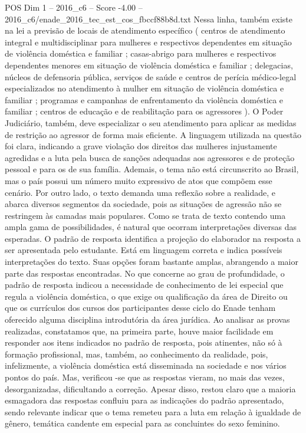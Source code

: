 \begin{textsample}{POS Dim 1 – 2016\_c6 – Score -4.00 – 2016\_c6/enade\_2016\_tec\_est\_cos\_fbccf88b8d.txt}
Nessa linha, também existe na lei a previsão de locais de atendimento específico ( centros de atendimento integral e multidisciplinar para mulheres e respectivos dependentes em situação de violência doméstica e familiar ; casas-abrigo para mulheres e respectivos dependentes menores em situação de violência doméstica e familiar ; delegacias, núcleos de defensoria pública, serviços de saúde e centros de perícia médico-legal especializados no atendimento à mulher em situação de violência doméstica e familiar ; programas e campanhas de enfrentamento da violência doméstica e familiar ; centros de educação e de reabilitação para os agressores ).
O Poder Judiciário, também, deve especializar o seu atendimento para aplicar as medidas de restrição ao agressor de forma mais eficiente.
A linguagem utilizada na questão foi clara, indicando a grave violação dos direitos das mulheres injustamente agredidas e a luta pela busca de sanções adequadas aos agressores e de proteção pessoal e para os de sua família.
Ademais, o tema não está circunscrito ao Brasil, mas o país possui um número muito expressivo de atos que compõem esse cenário.
Por outro lado, o texto demanda uma reflexão sobre a realidade, e abarca diversos segmentos da sociedade, pois as situações de agressão não se restringem às camadas mais populares.
Como se trata de texto contendo uma ampla gama de possibilidades, é natural que ocorram interpretações diversas das esperadas.
O padrão de resposta identifica a projeção do elaborador na resposta a ser apresentada pelo estudante.
Está em linguagem correta e indica possíveis interpretações do texto.
Suas opções foram bastante amplas, abrangendo a maior parte das respostas encontradas.
No que concerne ao grau de profundidade, o padrão de resposta indicou a necessidade de conhecimento de lei especial que regula a violência doméstica, o que exige ou qualificação da área de Direito ou que os currículos dos cursos dos participantes desse ciclo do Enade tenham oferecido alguma disciplina introdutória da área jurídica.
Ao analisar as provas realizadas, constatamos que, na primeira parte, houve maior facilidade em responder aos itens indicados no padrão de resposta, pois atinentes, não só à formação profissional, mas, também, ao conhecimento da realidade, pois, infelizmente, a violência doméstica está disseminada na sociedade e nos vários pontos do país.
Mas, verificou -se que as respostas vieram, no mais das vezes, desorganizadas, dificultando a correção.
Apesar disso, restou claro que a maioria esmagadora das respostas confluiu para as indicações do padrão apresentado, sendo relevante indicar que o tema remeteu para a luta em relação à igualdade de gênero, temática candente em especial para as concluintes do sexo feminino.

\end{textsample}
